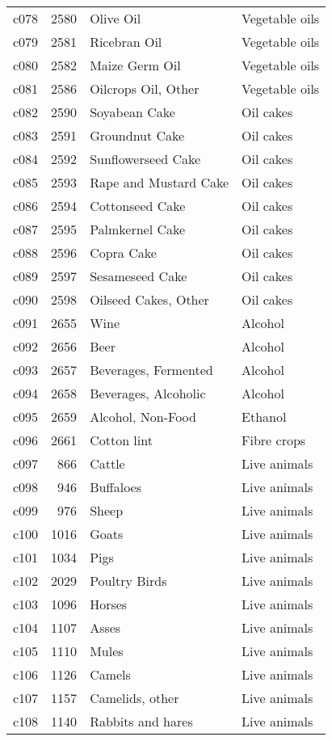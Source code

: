 \documentclass[]{article}
\begin{document}
\begin{longtable}[t]{lrll}
c078 & 2580 & Olive Oil & Vegetable oils\\
c079 & 2581 & Ricebran Oil & Vegetable oils\\
c080 & 2582 & Maize Germ Oil & Vegetable oils\\
\addlinespace
c081 & 2586 & Oilcrops Oil, Other & Vegetable oils\\
c082 & 2590 & Soyabean Cake & Oil cakes\\
c083 & 2591 & Groundnut Cake & Oil cakes\\
c084 & 2592 & Sunflowerseed Cake & Oil cakes\\
c085 & 2593 & Rape and Mustard Cake & Oil cakes\\
\addlinespace
c086 & 2594 & Cottonseed Cake & Oil cakes\\
c087 & 2595 & Palmkernel Cake & Oil cakes\\
c088 & 2596 & Copra Cake & Oil cakes\\
c089 & 2597 & Sesameseed Cake & Oil cakes\\
c090 & 2598 & Oilseed Cakes, Other & Oil cakes\\
\addlinespace
c091 & 2655 & Wine & Alcohol\\
c092 & 2656 & Beer & Alcohol\\
c093 & 2657 & Beverages, Fermented & Alcohol\\
c094 & 2658 & Beverages, Alcoholic & Alcohol\\
c095 & 2659 & Alcohol, Non-Food & Ethanol\\
\addlinespace
c096 & 2661 & Cotton lint & Fibre crops\\
c097 & 866 & Cattle & Live animals\\
c098 & 946 & Buffaloes & Live animals\\
c099 & 976 & Sheep & Live animals\\
c100 & 1016 & Goats & Live animals\\
\addlinespace
c101 & 1034 & Pigs & Live animals\\
c102 & 2029 & Poultry Birds & Live animals\\
c103 & 1096 & Horses & Live animals\\
c104 & 1107 & Asses & Live animals\\
c105 & 1110 & Mules & Live animals\\
\addlinespace
c106 & 1126 & Camels & Live animals\\
c107 & 1157 & Camelids, other & Live animals\\
c108 & 1140 & Rabbits and hares & Live animals\\

\end{longtable}
\end{document}
